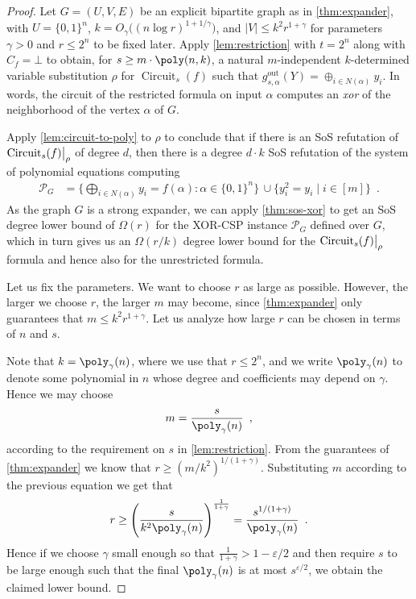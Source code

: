 \documentclass[10pt,a4paper]{article}
\theoremstyle{plain}
\theoremstyle{remark}
\theoremstyle{definition}
\newcommand{\eps}{\varepsilon}
\newcommand{\eqcomma}{\enspace ,}
\newcommand{\eqperiod}{\enspace .}
\newcommand{\set}[1]{\{#1\}}
\newcommand\restrict[2]{{%
  \left.\kern-\nulldelimiterspace %
  #1 %
  \vphantom{\big|} %
  \right|_{#2} %
  }}
\newcommand{\calP}{\mathcal{P}}
\newcommand{\gout}{g^\mathrm{out}}
\DeclareMathOperator{\circuit}{Circuit}
\begin{document}
\begin{proof}
  Let $G = (U, V, E)$ be an explicit bipartite graph as in
  \cref{thm:expander}, with $U = \{0,1\}^n$,
  $k = O_{\gamma}\big((n \log r)^{1 + 1/\gamma}\big)$, and
  $|V| \le k^2 r^{1+\gamma}$ for parameters $\gamma > 0$ and
  $r \le 2^n$ to be fixed later. Apply \cref{lem:restriction} with $t=2^n$ along with
  $C_f = \bot$ to obtain, for $s \ge m \cdot \poly(n, k)$, a natural
  $m$-independent $k$-determined variable substitution $\rho$ for
  $\circuit_s(f)$ such that
  $\gout_{s, \alpha}(Y) = \oplus_{i \in N(\alpha)} y_i$. In words, the
  circuit of the restricted formula on input $\alpha$ computes an
  \emph{xor} of the neighborhood of the vertex $\alpha$ of $G$.

  Apply \cref{lem:circuit-to-poly} to $\rho$ to conclude that if there
  is an SoS refutation of $\restrict{\circuit_s(f)}{\rho}$ of degree
  $d$, then there is a degree $d \cdot k$ SoS refutation of the system
  of polynomial equations computing
  \begin{align}
    \nonumber
    \calP_G
    &= \Big\{
    \bigoplus_{i \in N(\alpha)} y_i = f(\alpha)
    :
    \alpha \in \set{0,1}^n
    \Big\}\,
    \cup
    \set{
    y_i^2 = y_i\mid i \in [m]
    }
    \eqperiod
  \end{align}
%
  As the graph $G$ is a strong expander, we can apply
  \cref{thm:sos-xor} to get an SoS degree lower bound of $\Omega(r)$
  for the XOR-CSP instance $\calP_G$ defined over $G$, which in turn
  gives us an $\Omega(r/k)$ degree lower bound for the
  $\restrict{\circuit_s(f)}{\rho}$ formula and hence also for the
  unrestricted formula.

  Let us fix the parameters. We want to choose $r$ as large as
  possible. However, the larger we choose $r$, the larger $m$ may
  become, since \cref{thm:expander} only guarantees that
  $m \le k^2 r^{1+\gamma}$. Let us analyze how large $r$ can be chosen
  in terms of $n$ and $s$.

  Note that $k = \poly_\gamma(n)$, where we use that $r \le 2^n$, and we write
  $\poly_\gamma(n)$ to denote some polynomial in $n$ whose degree and
  coefficients may depend on $\gamma$. Hence we may choose
  \begin{align}
    m = \frac{s}{\poly_{\gamma}(n)} \eqcomma
  \end{align}
  according to the requirement on $s$ in \cref{lem:restriction}.  From
  the guarantees of \cref{thm:expander} we know that
  $r \ge (m/k^2)^{1/(1+\gamma)}$. Substituting $m$ according to the
  previous equation we get that
  \begin{align}
    r
    \ge
    \left(
    \frac{s}{
    k^2 \poly_{\gamma}(n)
    }
    \right)^{\frac{1}{1 + \gamma}}
    =
    \frac{s^{1/(1 + \gamma)}}{\poly_{\gamma}(n)} \eqperiod
  \end{align}
  Hence if we choose $\gamma$ small enough so that
  $\frac{1}{1+\gamma} > 1-\eps/2$ and then require $s$ to be large
  enough such that the final $\poly_{\gamma}(n)$ is at most
  $s^{\eps/2}$, we obtain the claimed lower bound.
\end{proof}
\end{document}
